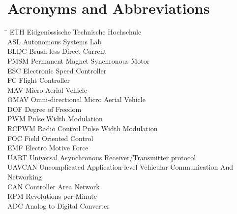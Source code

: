 \section*{Acronyms and Abbreviations}
\begin{tabbing}
 \hspace*{1.6cm}  \= \kill
 ETH \> Eidgenössische Technische Hochschule \\[0.5ex]
 ASL \> Autonomous Systems Lab \\[0.5ex]
 BLDC \> Brush-less Direct Current \\[0.5ex]
 PMSM \> Permanent Magnet Synchronous Motor \\[0.5ex]
 ESC \> Electronic Speed Controller \\[0.5ex]
 FC \> Flight Controller\\[0.5ex]
 MAV \> Micro Aerial Vehicle \\[0.5ex]
 OMAV \> Omni-directional Micro Aerial Vehicle\\[0.5ex]
 DOF \> Degree of Freedom\\[0.5ex] 
 PWM \> Pulse Width Modulation\\[0.5ex]
 RCPWM \> Radio Control Pulse Width Modulation\\[0.5ex]
 FOC \> Field Oriented Control \\[0.5ex]
 EMF \> Electro Motive Force \\[0.5ex]
 UART \> Universal Asynchronous Receiver/Transmitter protocol \\[0.5ex]
 UAVCAN \>  Uncomplicated Application-level Vehicular Communication And Networking\\[0.5ex]
CAN \>	Controller Area Network\\ [0.5ex]
RPM \>	Revolutions per Minute\\[0.5ex]
ADC \> Analog to Digital Converter\\[0.5ex]
 \end{tabbing}